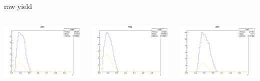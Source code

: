 \begin{frame}{raw yield}
\begin{columns}
\begin{column}[T]{0.25\textwidth}
\includegraphics[width = \textwidth]{results/yield/statistics/yield_x_Q2_z_0.50_5.000_0.40_pos.png}
\end{column}
\begin{column}[T]{0.25\textwidth}
\includegraphics[width = \textwidth]{results/yield/statistics/yield_x_Q2_z_0.50_5.000_0.40_neg.png}
\end{column}
\begin{column}[T]{0.25\textwidth}
\includegraphics[width = \textwidth]{results/yield/statistics/yield_x_Q2_z_0.50_5.000_0.50_pos.png}

\end{column}
\end{columns}
\end{frame}
